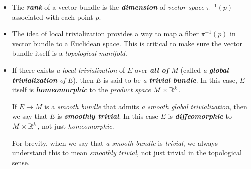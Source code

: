 \documentclass[11pt]{article}
\begin{document}
\begin{itemize}
\item \begin{remark}
The \emph{\textbf{rank}} of a vector bundle is the \emph{\textbf{dimension}} of \emph{vector space} $\pi^{-1}(p)$ associated with each point $p$.
\end{remark}

\item \begin{remark}
The idea of local trivialization provides a way to map a fiber $\pi^{-1}(p)$ in vector bundle to a Euclidean space. This is critical to make sure the vector bundle itself is a \emph{topological manifold}. 
\end{remark}

\item \begin{definition}
If there exists \emph{a local trivialization} of $E$ over \emph{\textbf{all of $M$}} (called \emph{a \textbf{global trivialization} of} $E$), then $E$ is said to be \emph{a \textbf{trivial bundle}}. In this case, $E$ itself is \emph{\textbf{homeomorphic}} to the \emph{product space} $M \times {\mathbb R}^k$. 

If $E \rightarrow M$ is a \emph{smooth bundle} that admits \emph{a smooth global trivialization}, then we say that $E$ is \emph{\textbf{smoothly trivial}}. In this case $E$
is \emph{\textbf{diffeomorphic}} to $M \times {\mathbb R}^k$, not just \emph{homeomorphic}. 
\end{definition}
For brevity, when we say that \emph{a smooth bundle} is \emph{trivial}, we always understand this to mean \emph{smoothly trivial}, not just trivial in the topological sense.



\end{itemize}
\end{document}
